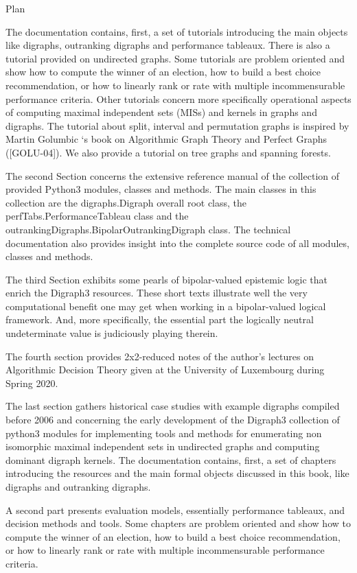 Plan


The documentation contains, first, a set of tutorials introducing the main objects like digraphs, outranking digraphs and performance tableaux. There is also a tutorial provided on undirected graphs. Some tutorials are problem oriented and show how to compute the winner of an election, how to build a best choice recommendation, or how to linearly rank or rate with multiple incommensurable performance criteria. Other tutorials concern more specifically operational aspects of computing maximal independent sets (MISs) and kernels in graphs and digraphs. The tutorial about split, interval and permutation graphs is inspired by Martin Golumbic ‘s book on Algorithmic Graph Theory and Perfect Graphs ([GOLU-04]). We also provide a tutorial on tree graphs and spanning forests.

The second Section concerns the extensive reference manual of the collection of provided Python3 modules, classes and methods. The main classes in this collection are the digraphs.Digraph overall root class, the perfTabs.PerformanceTableau class and the outrankingDigraphs.BipolarOutrankingDigraph class. The technical documentation also provides insight into the complete source code of all modules, classes and methods.

The third Section exhibits some pearls of bipolar-valued epistemic logic that enrich the Digraph3 resources. These short texts illustrate well the very computational benefit one may get when working in a bipolar-valued logical framework. And, more specifically, the essential part the logically neutral undeterminate value is judiciously playing therein.

The fourth section provides 2x2-reduced notes of the author’s lectures on Algorithmic Decision Theory given at the University of Luxembourg during Spring 2020.

The last section gathers historical case studies with example digraphs compiled before 2006 and concerning the early development of the Digraph3 collection of python3 modules for implementing tools and methods for enumerating non isomorphic maximal independent sets in undirected graphs and computing dominant digraph kernels.
The documentation contains, first, a set of chapters introducing the \Digraph resources and the main formal objects discussed in this book, like digraphs and outranking digraphs.

A second part presents evaluation models, essentially performance tableaux, and decision methods and tools. Some chapters are problem oriented and show how to compute the winner of an election, how to build a best choice recommendation, or how to linearly rank or rate with multiple incommensurable performance criteria.

